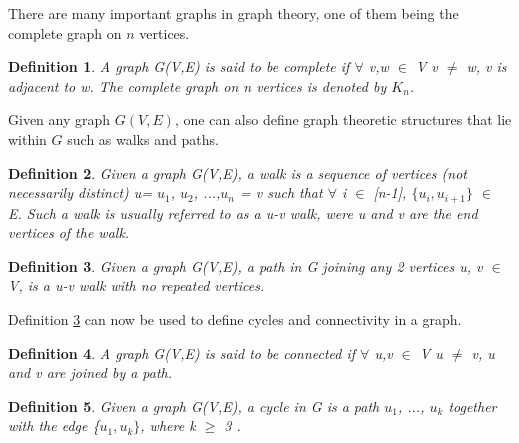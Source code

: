 \documentclass[12pt]{article}
\newtheorem{definition}{Definition}[subsection]
\numberwithin{equation}{subsection}
\numberwithin{table}{subsection}
\numberwithin{algorithm}{subsection}
\begin{document}
There are many important graphs in graph theory, one of them being the complete graph on $\mathit{n}$ vertices.
\begin{definition}
\label{Complete Graph}
A graph G(V,E) is said to be complete if $\forall$ v,w $\in$ V v $\neq$ w, v is adjacent to w. The complete graph on n vertices is denoted by $K_n$. 
\end{definition}
Given any graph $\mathit{G(V,E)}$, one can also define graph theoretic structures that lie within $\mathit{G}$ such as walks and paths.
\begin{definition}
\label{walk}
Given a graph G(V,E), a walk is a sequence of vertices (not necessarily distinct) u= $u_1$, $u_2$, ...,$u_n$ = v such that $\forall$ i $\in$ [n-1], $\{u_i, u_{i+1}\}$ $\in$ E. Such a walk is usually referred to as a u-v walk, were u and v are the end vertices of the walk. 
\end{definition}
\begin{definition}
\label{Path}
Given a graph G(V,E), a path in G joining any 2 vertices u, v $\in$ V, is a u-v walk with no repeated vertices.
\end{definition}
Definition \ref{Path} can now be used to define cycles and connectivity in a graph.
\begin{definition}
\label{connectedgraph}
A graph G(V,E) is said to be connected if $\forall$ u,v $\in$ V u $\neq$ v, u and v are joined by a path. 
\end{definition}
\begin{definition}
\label{cycle}
Given a graph G(V,E), a cycle in G is a path $u_1$, ..., $u_k$ together with the edge \{$u_1, u_k\}$, where k $\geq$ 3 . 
\end{definition}
\end{document}
